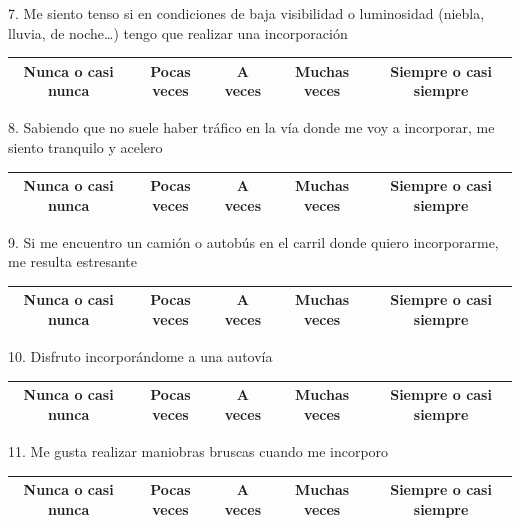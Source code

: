 7. Me siento tenso si en condiciones de baja visibilidad o luminosidad (niebla, lluvia, de noche…) tengo que realizar una incorporación
\begin{table}[H]
\centering
\begin{tabular}{|c|c|c|c|c|}
\hline
Nunca o casi nunca & Pocas veces & A veces & Muchas veces & Siempre o casi siempre \\ \hline
\end{tabular}
\end{table}

8. Sabiendo que no suele haber tráfico en la vía donde me voy a incorporar, me siento tranquilo y acelero
\vspace{-10pt}
\begin{table}[H]
\centering
\begin{tabular}{|c|c|c|c|c|}
\hline
Nunca o casi nunca & Pocas veces & A veces & Muchas veces & Siempre o casi siempre \\ \hline
\end{tabular}
\end{table}

9. Si me encuentro un camión o autobús en el carril donde quiero incorporarme, me resulta estresante
\vspace{-10pt}
\begin{table}[H]
\centering
\begin{tabular}{|c|c|c|c|c|}
\hline
Nunca o casi nunca & Pocas veces & A veces & Muchas veces & Siempre o casi siempre \\ \hline
\end{tabular}
\end{table}

10. Disfruto incorporándome a una autovía
\vspace{-10pt}
\begin{table}[H]
\centering
\begin{tabular}{|c|c|c|c|c|}
\hline
Nunca o casi nunca & Pocas veces & A veces & Muchas veces & Siempre o casi siempre \\ \hline
\end{tabular}
\end{table}

11. Me gusta realizar maniobras bruscas cuando me incorporo
\vspace{-10pt}
\begin{table}[H]
\centering
\begin{tabular}{|c|c|c|c|c|}
\hline
Nunca o casi nunca & Pocas veces & A veces & Muchas veces & Siempre o casi siempre \\ \hline
\end{tabular}
\end{table}

